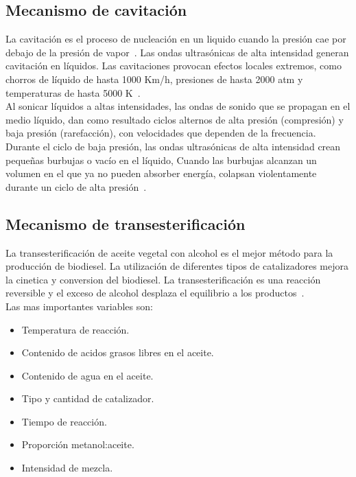 \documentclass[a4paper,10pt]{article}
\begin{document}
\subsection{Mecanismo de cavitación}
La cavitación es el proceso de nucleación en un liquido cuando la presión cae por debajo de la presión de vapor~\cite{khosravi2016,brennen2013}.
Las ondas ultrasónicas de alta intensidad generan cavitación en líquidos. 
Las cavitaciones provocan efectos locales extremos, como chorros de líquido de hasta 1000 Km/h, 
presiones de hasta 2000 atm y temperaturas de hasta 5000 K~\cite{gude2013}. \\
Al sonicar líquidos a altas intensidades, las ondas de sonido que se propagan en el medio líquido, dan como resultado ciclos alternos 
de alta presión (compresi\'on) y baja presión (rarefacci\'on), con velocidades que dependen de la frecuencia. Durante el ciclo de baja presión, 
las ondas ultrasónicas de alta intensidad crean pequeñas burbujas  o vacío en el líquido,
Cuando las burbujas alcanzan un volumen en el que ya no pueden absorber energía, colapsan violentamente durante un ciclo de alta presión~\cite{khosravi2016,suslick1999}.

\subsection{Mecanismo de transesterificación}
La transesterificación de aceite vegetal con alcohol es el mejor método para la producción de biodiesel. La utilización de diferentes 
tipos de catalizadores mejora la cinetica y conversion del biodiesel. La transesterificación es una reacción reversible y el exceso de 
alcohol desplaza el equilibrio a los productos~\cite{talebian2013}. \\ %
Las mas importantes variables son:
\begin{itemize}
 \item Temperatura de reacción.
 \item Contenido de acidos grasos libres en el aceite.
 \item Contenido de agua en el aceite.
 \item Tipo y cantidad de catalizador.
 \item Tiempo de reacción.
 \item Proporción metanol:aceite.
 \item Intensidad de mezcla.
\end{itemize}
\end{document}
